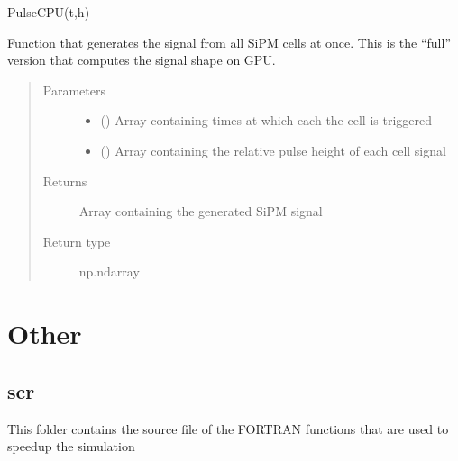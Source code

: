 \documentclass[letterpaper,10pt,english]{sphinxmanual}
\begin{document}
\begin{fulllineitems}
\label{\detokenize{structure:libs.libGPU.PulseGPU}}
PulseCPU(t,h)

Function that generates the signal from all SiPM cells at once. This is the “full” version that computes the signal shape on GPU.
\begin{quote}\begin{description}
\item[{Parameters}] \leavevmode\begin{itemize}
\item {} 
 (\sphinxstyleliteralemphasis{\sphinxupquote{(}}\sphinxstyleliteralemphasis{\sphinxupquote{)}}) \textendash{} Array containing times at which each the cell is triggered

\item {} 
 (\sphinxstyleliteralemphasis{\sphinxupquote{(}}\sphinxstyleliteralemphasis{\sphinxupquote{)}}) \textendash{} Array containing the relative pulse height of each cell signal

\end{itemize}

\item[{Returns}] \leavevmode
{} \textendash{} Array containing the generated SiPM signal

\item[{Return type}] \leavevmode
np.ndarray

\end{description}\end{quote}

\end{fulllineitems}



\section{Other}
\label{\detokenize{structure:other}}

\subsection{scr}
\label{\detokenize{structure:scr}}
This folder contains the source file of the FORTRAN functions that are used to speed\sphinxhyphen{}up the simulation
\end{document}
